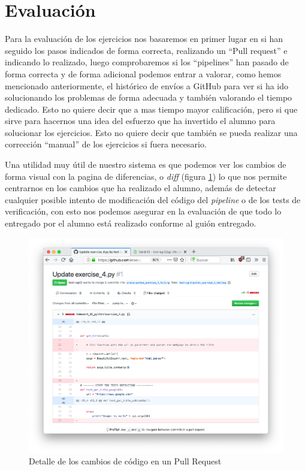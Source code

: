 \section{Evaluación}

Para la evaluación de los ejercicios nos basaremos en primer lugar en si han seguido los pasos indicados de forma correcta, realizando un ``Pull request'' e indicando lo realizado, luego comprobaremos si los ``pipelines'' han pasado de forma correcta y de forma adicional podemos entrar a valorar, como hemos mencionado anteriormente, el histórico de envíos a GitHub para ver si ha ido solucionando los problemas de forma adecuada y también valorando el tiempo dedicado. Esto no quiere decir que a mas tiempo mayor calificación, pero si que sirve para hacernos una idea del esfuerzo que ha invertido el alumno para solucionar los ejercicios. Esto no quiere decir que también se pueda realizar una corrección ``manual'' de los ejercicios si fuera necesario.

\bigskip
Una utilidad muy útil de nuestro sistema es que podemos ver los cambios de forma visual con la pagina de diferencias, o \textit{diff} (figura \ref{fig:github_pr_diff}) lo que nos permite centrarnos en los cambios que ha realizado el alumno, además de detectar cualquier posible intento de modificación del código del \textit{pipeline} o de los tests de verificación, con esto nos podemos asegurar en la evaluación de que todo lo entregado por el alumno está realizado conforme al guión entregado.

\begin{figure}[h!]
\centering
\includegraphics[width=1.0\textwidth]{../images/github_pr_diff}
\caption{Detalle de los cambios de código en un Pull Request}
\label{fig:github_pr_diff}
\end{figure}




